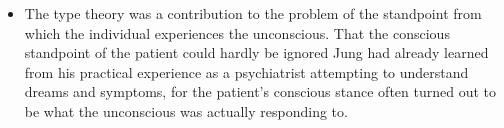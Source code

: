 \begin{table}[h]
\caption[Understanding Consciousness Through the Theory of Phsychological Types~\verified]{%
Understanding Consciousness Through the Theory of Psychological Types\\
\verified~\textcolor{gray}{\small Source: ``Understanding Consciousness Through the Theory of Psychological Types'' from Beebe~\cite{beebe}.}}

\begin{itemize}
\item

The type theory was a contribution to the problem of the standpoint from which
the individual experiences the unconscious. That the conscious standpoint of
the patient could hardly be ignored Jung had already learned from his practical
experience as a psychiatrist attempting to understand dreams and symptoms, for
the patient’s conscious stance often turned out to be what the unconscious was
actually responding to.

\end{itemize}

\end{table}
